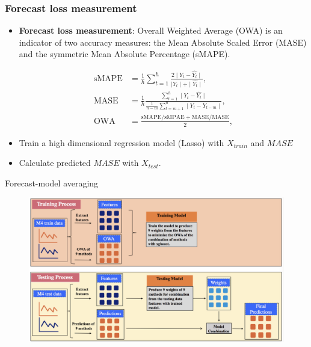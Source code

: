 \documentclass[10pt,aspectratio=43]{beamer}
\begin{document}
\begin{frame}
  \frametitle{Forecast loss measurement}
  \begin{itemize}
  \item \textbf{Forecast loss measurement}: Overall Weighted Average (OWA) is an indicator
    of two accuracy measures: the Mean Absolute Scaled Error (MASE) and the symmetric Mean
    Absolute Percentage (sMAPE).

\begin{equation*}
  \begin{aligned}
    \mathrm{sMAPE}&=\frac{1}{h}\sum_{t=1}^h\frac{2\mid Y_{t}-\widehat{Y_{t}}\mid}{\mid Y_{t}\mid+\mid\widehat{Y_{t}} \mid},\\
    \mathrm{MASE}&=\frac{1}{h}\frac{\sum_{t=1}^h\mid Y_{t}-\widehat{Y_{t}} \mid}{\frac{1}{n-m}\sum_{t=m+1}^n\mid Y_{t}-Y_{t-m} \mid},\\
    \mathrm{OWA}&=\frac{\mathrm{sMAPE /sMPAE + MASE/MASE}}{2},
  \end{aligned}
\end{equation*}



\item Train a high dimensional regression model (Lasso) with $X_{train}$ and $M ASE$
\item Calculate predicted $MASE$ with $X_{test}$.
\end{itemize}

\end{frame}

\begin{frame} {Forecast-model averaging}
  \begin{figure}%
  \centering
  \includegraphics[width=1\linewidth]{figures/model_averaging1.png}
  \label{fig:framework}
\end{figure}

\end{frame}
\end{document}

